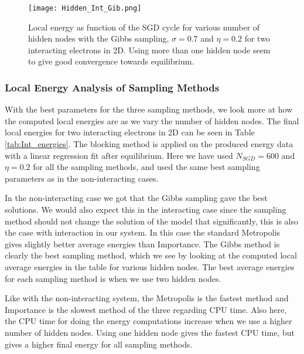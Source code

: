 \documentclass[12pt,a4paper,english]{article}
\begin{document}
\begin{figure}[t!]
	\centering\texttt{[image: Hidden\_Int\_Gib.png]}
	\caption{Local energy as function of the SGD cycle for various number of hidden nodes with the Gibbs sampling, $\sigma=0.7$ and $\eta=0.2$ for two interacting electrons in 2D. Using more than one hidden node seem to give good convergence towards equilibrium. \label{fig:check_hidden_Int_Gib}}
\end{figure}

\newpage
\subsubsection{Local Energy Analysis of Sampling Methods}
\label{subsubsect:Results_int_Analysis}
With the best parameters for the three sampling methods, we look more at how the computed local energies are as we vary the number of hidden nodes. The final local energies for two interacting electrons in 2D can be seen in Table \ref{tab:Int_energies}. The blocking method is applied on the produced energy data with a linear regression fit after equilibrium. Here we have used $N_{SGD}=600$ and $\eta=0.2$ for all the sampling methods, and used the same best sampling parameters as in the non-interacting cases.

In the non-interacting case we got that the Gibbs sampling gave the best solutions. We would also expect this in the interacting case since the sampling method should not change the solution of the model that significantly, this is also the case with interaction in our system. In this case the standard Metropolis gives slightly better average energies than Importance. The Gibbs method is clearly the best sampling method, which we see by looking at the computed local average energies in the table for various hidden nodes. The best average energies for each sampling method is when we use two hidden nodes.

Like with the non-interacting system, the Metropolis is the fastest method and Importance is the slowest method of the three regarding CPU time. Also here, the CPU time for doing the energy computations increase when we use a higher number of hidden nodes. Using one hidden node gives the fastest CPU time, but gives a higher final energy for all sampling methods.
\end{document}
